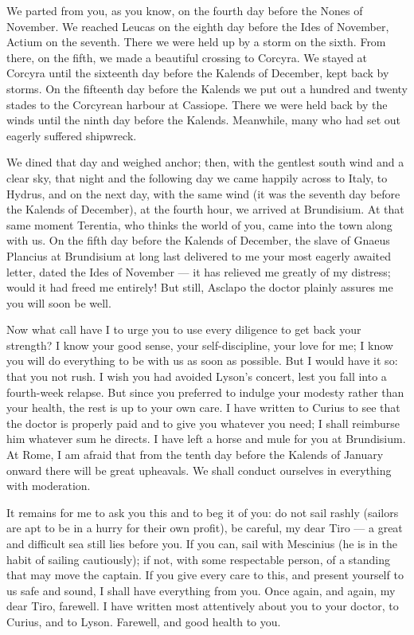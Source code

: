 

 We parted from you, as you know, on the fourth day before the Nones of November. We reached Leucas on the eighth day before the Ides of November, Actium on the seventh. There we were held up by a storm on the sixth. From there, on the fifth, we made a beautiful crossing to Corcyra. We stayed at Corcyra until the sixteenth day before the Kalends of December, kept back by storms. On the fifteenth day before the Kalends we put out a hundred and twenty stades to the Corcyrean harbour at Cassiope. There we were held back by the winds until the ninth day before the Kalends. Meanwhile, many who had set out eagerly suffered shipwreck.

 We dined that day and weighed anchor; then, with the gentlest south wind and a clear sky, that night and the following day we came happily across to Italy, to Hydrus, and on the next day, with the same wind (it was the seventh day before the Kalends of December), at the fourth hour, we arrived at Brundisium. At that same moment Terentia, who thinks the world of you, came into the town along with us. On the fifth day before the Kalends of December, the slave of Gnaeus Plancius at Brundisium at long last delivered to me your most eagerly awaited letter, dated the Ides of November --- it has relieved me greatly of my distress; would it had freed me entirely! But still, Asclapo the doctor plainly assures me you will soon be well.

 Now what call have I to urge you to use every diligence to get back your strength? I know your good sense, your self-discipline, your love for me; I know you will do everything to be with us as soon as possible. But I would have it so: that you not rush. I wish you had avoided Lyson's concert, lest you fall into a fourth-week relapse. But since you preferred to indulge your modesty rather than your health, the rest is up to your own care. I have written to Curius to see that the doctor is properly paid and to give you whatever you need; I shall reimburse him whatever sum he directs. I have left a horse and mule for you at Brundisium. At Rome, I am afraid that from the tenth day before the Kalends of January onward there will be great upheavals. We shall conduct ourselves in everything with moderation.

 It remains for me to ask you this and to beg it of you: do not sail rashly (sailors are apt to be in a hurry for their own profit), be careful, my dear Tiro --- a great and difficult sea still lies before you. If you can, sail with Mescinius (he is in the habit of sailing cautiously); if not, with some respectable person, of a standing that may move the captain. If you give every care to this, and present yourself to us safe and sound, I shall have everything from you. Once again, and again, my dear Tiro, farewell. I have written most attentively about you to your doctor, to Curius, and to Lyson. Farewell, and good health to you.
